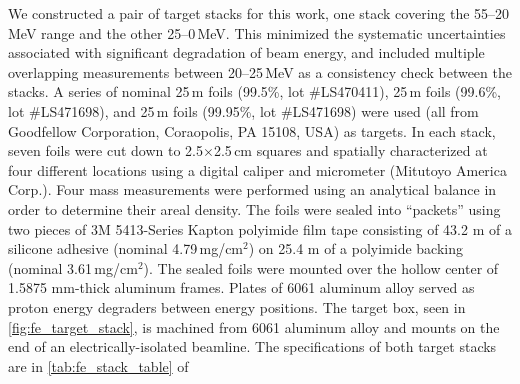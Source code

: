 We constructed a pair of target stacks 
for this work,
one stack covering the 55--20\,MeV range and the other  25--0\,MeV.
This minimized the systematic uncertainties associated with significant degradation of beam energy, and
included multiple overlapping measurements between 20--25\,MeV as a consistency check between the stacks.
A series of nominal 25\,\mmicro m  foils (99.5\%, lot \#LS470411), 25\,\mmicro m  foils (99.6\%, lot \#LS471698), and 25\,\mmicro m  foils (99.95\%, lot \#LS471698) were used (all from Goodfellow Corporation, Coraopolis, PA 15108, USA) as targets.
In each stack, seven foils 
were cut down to 2.5$\times$2.5\,cm squares and spatially characterized 
at four different locations using a digital caliper and micrometer (Mitutoyo America Corp.).
Four mass measurements were performed using an analytical balance 
in order to determine their areal density. 
The foils were  sealed into \enquote{packets} using two pieces of  3M 5413-Series Kapton polyimide film tape 
consisting of 43.2 \mmicro m of a silicone adhesive (nominal 4.79\,mg/cm$^2$) on 25.4 \mmicro m of a polyimide backing (nominal 3.61\,mg/cm$^2$).
The sealed foils were mounted over the hollow center of  1.5875 mm-thick aluminum frames.
Plates of 6061 aluminum alloy  served as proton energy degraders  between energy positions.
The target box, seen in \autoref{fig:fe_target_stack}, is machined from 6061 aluminum alloy and mounts on the end of an electrically-isolated beamline.
The specifications of both target stacks 
are in \autoref{tab:fe_stack_table} of 



